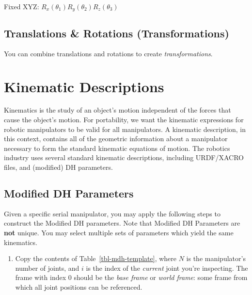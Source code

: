 \documentclass[
  letterpaper,
  DIV=11,
  numbers=noendperiod]{scrreprt}
\providecommand{\tightlist}{%
  \setlength{\itemsep}{0pt}\setlength{\parskip}{0pt}}\usepackage{longtable,booktabs,array}
\begin{document}
Fixed XYZ: \(R_x(\theta_1) R_y(\theta_2) R_z(\theta_3)\)

\hypertarget{translations-rotations-transformations}{%
\section{Translations \& Rotations
(Transformations)}\label{translations-rotations-transformations}}

You can combine translations and rotations to create
\emph{transformations}.


\hypertarget{kinematic-descriptions-1}{%
\chapter{Kinematic Descriptions}\label{kinematic-descriptions-1}}

Kinematics is the study of an object's motion independent of the forces
that cause the object's motion. For portability, we want the kinematic
expressions for robotic manipulators to be valid for all manipulators. A
kinematic description, in this context, contains all of the geometric
information about a manipulator necessary to form the standard kinematic
equations of motion. The robotics industry uses several standard
kinematic descriptions, including URDF/XACRO files, and (modified) DH
parameters.

\hfill\break

\hypertarget{modified-dh-parameters}{%
\section{Modified DH Parameters}\label{modified-dh-parameters}}

Given a specific serial manipulator, you may apply the following steps
to construct the Modified DH parameters. Note that Modified DH
Parameters are \textbf{not} unique. You may select multiple sets of
parameters which yield the same kinematics.

\begin{enumerate}
\def\labelenumi{\arabic{enumi}.}
\tightlist
\item
  Copy the contents of Table~\ref{tbl-mdh-template}, where \(N\) is the
  manipulator's number of joints, and \(i\) is the index of the
  \emph{current} joint you're inspecting. The frame with index \(0\)
  should be the \emph{base frame} or \emph{world frame}: some frame from
  which all joint positions can be referenced.
\end{enumerate}
\end{document}
